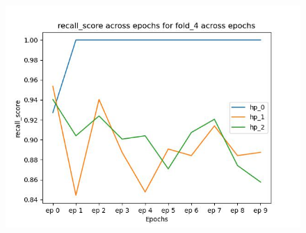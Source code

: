 \documentclass{article}
\begin{document}
\begin{figure}[H]
\includegraphics[scale = 0.75]{fold_4/recall_score}
\end{figure}
\end{document}
